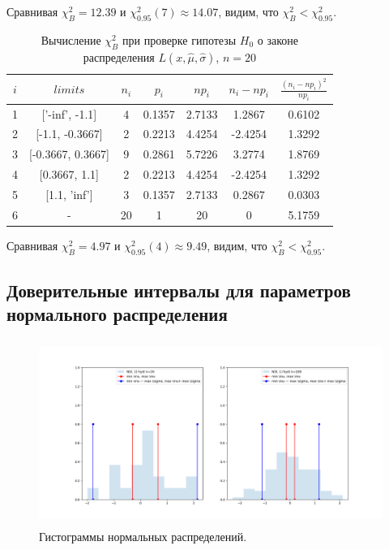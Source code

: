 \documentclass[../main.tex]{subfiles}
\begin{document}
    \noindent Сравнивая $\chi^{2}_{B} = 12.39$ и $\chi^{2}_{0.95}(7) \approx 14.07$, видим, что $\chi^{2}_{B} < \chi^{2}_{0.95}$.
    \\
    
    \begin{table}[H]
    	\centering
    	\begin{tabular}{| c | c | c | c | c | c | c |}
    		\hline
    		$i$ & $limits$         &   $n_i$ &    $p_i$ &   $np_i$ &   $n_i - np_i$ &   $\frac{(n_i-np_i)^2}{np_i}$ \\
            \hline
                1 & ['-inf', -1.1]    &  4 & 0.1357 &  2.7133 &  1.2867 & 0.6102 \\
                2 & [-1.1, -0.3667]   &  2 & 0.2213 &  4.4254 & -2.4254 & 1.3292 \\
                3 & [-0.3667, 0.3667] &  9 & 0.2861 &  5.7226 &  3.2774 & 1.8769 \\
                4 & [0.3667, 1.1]     &  2 & 0.2213 &  4.4254 & -2.4254 & 1.3292 \\
                5 & [1.1, 'inf']      &  3 & 0.1357 &  2.7133 &  0.2867 & 0.0303 \\
                6 & -                 & 20 & 1      & 20      &  0      & 5.1759 \\
            \hline
    	\end{tabular}
    	\caption{ Вычисление $\chi^{2}_{B}$ при проверке гипотезы $H_{0}$ о законе распределения $L(x,\hat{\mu}, \hat{\sigma})$, $n=20$}
    	\label{tab:laplace_chi_2}
    \end{table}
    
    \noindent Сравнивая $\chi^{2}_{B} =  4.97$ и $\chi^{2}_{0.95}(4) \approx 9.49$, видим, что $\chi^{2}_{B} < \chi^{2}_{0.95}$.
    \\
    
    \subsection{Доверительные интервалы для параметров нормального распределения}
    \begin{figure}[H]
		\centering
		    \includegraphics[width = 20cm, height = 6cm]{figures/normal.png}
		\caption{Гистограммы нормальных распределений.}
		\label{w_pert}
	\end{figure}
    
\end{document}
